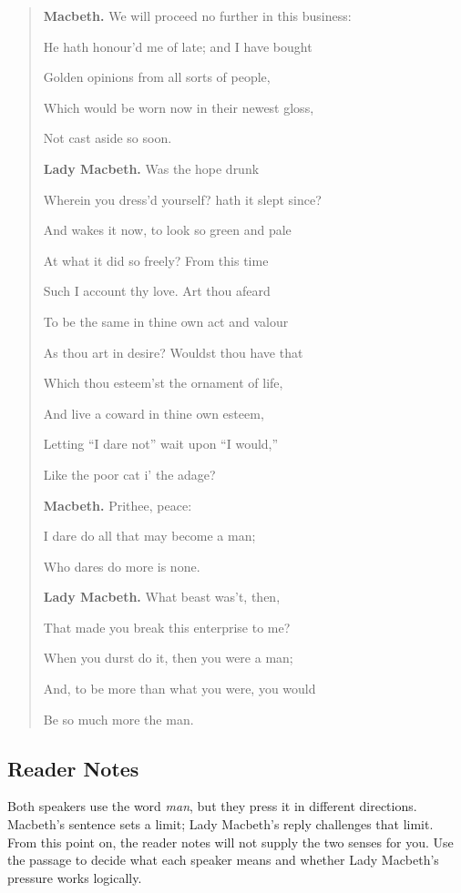 \documentclass[12pt]{article}
\newenvironment{playpassage}{\begin{quote}\small\setlength{\parskip}{0.25em}}{\end{quote}}
\newcommand{\speaker}[1]{\textbf{#1.}}
\begin{document}
\begin{playpassage}
\speaker{Macbeth} We will proceed no further in this business:\par
He hath honour'd me of late; and I have bought\par
Golden opinions from all sorts of people,\par
Which would be worn now in their newest gloss,\par
Not cast aside so soon.

\speaker{Lady Macbeth} Was the hope drunk\par
Wherein you dress'd yourself? hath it slept since?\par
And wakes it now, to look so green and pale\par
At what it did so freely? From this time\par
Such I account thy love. Art thou afeard\par
To be the same in thine own act and valour\par
As thou art in desire? Wouldst thou have that\par
Which thou esteem'st the ornament of life,\par
And live a coward in thine own esteem,\par
Letting ``I dare not'' wait upon ``I would,''\par
Like the poor cat i' the adage?

\speaker{Macbeth} Prithee, peace:\par
I dare do all that may become a man;\par
Who dares do more is none.

\speaker{Lady Macbeth} What beast was't, then,\par
That made you break this enterprise to me?\par
When you durst do it, then you were a man;\par
And, to be more than what you were, you would\par
Be so much more the man.
\end{playpassage}

\subsection*{Reader Notes}

Both speakers use the word \textit{man}, but they press it in different directions. Macbeth's sentence sets a limit; Lady Macbeth's reply challenges that limit. From this point on, the reader notes will not supply the two senses for you. Use the passage to decide what each speaker means and whether Lady Macbeth's pressure works logically.
\end{document}
